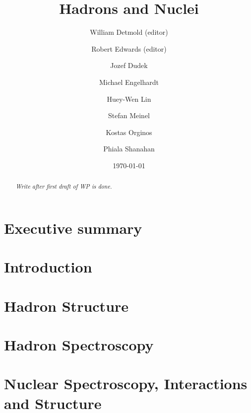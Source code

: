 \documentclass[aps,prd,nofootinbib,floatfix,superscriptaddress,preprint,tightenlines]{revtex4-1}
\begin{document}
\title{Hadrons and Nuclei}
\author{William Detmold (editor)}
\author{Robert Edwards (editor)}
\author{Jozef Dudek}
\author{Michael Engelhardt}
\author{Huey-Wen Lin}
\author{Stefan Meinel}
\author{Kostas Orginos}
\author{Phiala Shanahan}




\date{\today}
%
\begin{abstract}
\emph{Write after first draft of WP is done.}
    
\end{abstract}

\maketitle

\section*{Executive summary}


\newpage
\tableofcontents
\newpage 

\section{Introduction}
\label{sec:intro}



\section{Hadron Structure}
\label{sec:hadronstructure}


\section{Hadron Spectroscopy}
\label{sec:hadronspectroscopy}


\section{Nuclear Spectroscopy, Interactions and Structure}


\begin{figure}
    \vspace*{3cm}
\end{figure}



\end{document}
